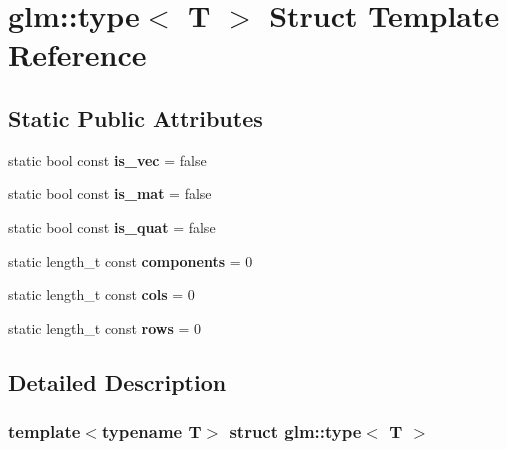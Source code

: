 \hypertarget{structglm_1_1type}{}\section{glm\+:\+:type$<$ T $>$ Struct Template Reference}
\label{structglm_1_1type}
\subsection*{Static Public Attributes}
\begin{DoxyCompactItemize}
\item 
\mbox{\label{structglm_1_1type_a236fedee521c9783b686e86c0e1405e0}} 
static bool const {\bfseries is\+\_\+vec} = false
\item 
\mbox{\label{structglm_1_1type_a21702de90bcb0212e4856a22d947bfa3}} 
static bool const {\bfseries is\+\_\+mat} = false
\item 
\mbox{\label{structglm_1_1type_ac0e332a405282f738486bc2134881df8}} 
static bool const {\bfseries is\+\_\+quat} = false
\item 
\mbox{\label{structglm_1_1type_a678f2d75a5ec89fcaceb0934a52800b7}} 
static length\+\_\+t const {\bfseries components} = 0
\item 
\mbox{\label{structglm_1_1type_aa1006a5c502504cd22582b088e675774}} 
static length\+\_\+t const {\bfseries cols} = 0
\item 
\mbox{\label{structglm_1_1type_ad04a64a448a28061ed81f90f0f52b691}} 
static length\+\_\+t const {\bfseries rows} = 0
\end{DoxyCompactItemize}


\subsection{Detailed Description}
\subsubsection*{template$<$typename T$>$\newline
struct glm\+::type$<$ T $>$}



